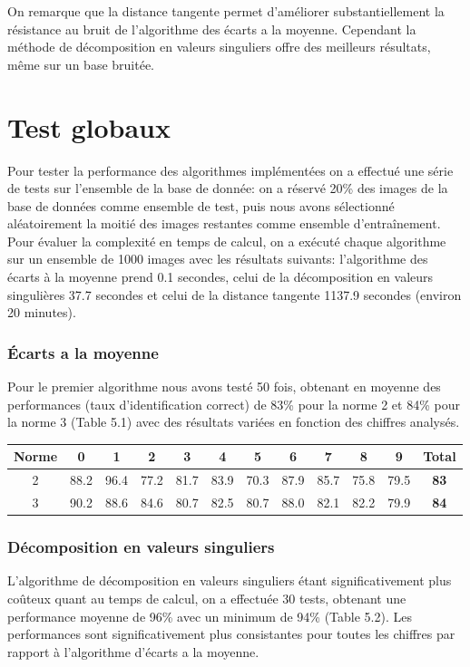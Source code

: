\documentclass[a4paper,11pt,twoside]{report}
\begin{document}
On remarque que la distance tangente permet d’améliorer substantiellement la résistance au bruit de l'algorithme des écarts a la moyenne. Cependant la méthode de décomposition en valeurs singuliers offre des meilleurs résultats, même sur un base bruitée.

\chapter{Test globaux}

Pour tester la performance des algorithmes implémentées on a effectué une série de tests sur l'ensemble de la base de donnée: on a réservé 20\% des images de la base de données comme ensemble de test, puis nous avons sélectionné aléatoirement la moitié des images restantes comme ensemble d’entraînement.\\
Pour évaluer la complexité en temps de calcul, on a exécuté chaque algorithme sur un ensemble de 1000 images avec les résultats suivants: l'algorithme des écarts à la moyenne prend 0.1 secondes, celui de la décomposition en valeurs singulières 37.7 secondes et celui de la distance tangente 1137.9 secondes (environ 20 minutes).

\subsection{Écarts a la moyenne}
Pour le premier algorithme nous avons testé 50 fois, obtenant en moyenne des performances (taux d'identification correct) de 83\% pour la norme 2 et 84\% pour la norme 3 (Table 5.1) avec des résultats variées en fonction des chiffres analysés.

\begin{center}
\begin{tabular}{ |c||c|c|c|c|c|c|c|c|c|c|c| } 
\hline
 Norme & 0 & 1 & 2 & 3 & 4 & 5 & 6 & 7 & 8 & 9 & \textbf{Total} \\ 
  \hline
  \hline
  2 & 88.2 & 96.4 & 77.2 & 81.7 & 83.9 & 70.3 & 87.9 & 85.7 & 75.8 & 79.5 & \textbf{83} \\
 \hline
  3 & 90.2 & 88.6 & 84.6 & 80.7 & 82.5 & 80.7 & 88.0 & 82.1 & 82.2 & 79.9 & \textbf{84} \\
 \hline
\end{tabular}
\end{center}

\subsection{Décomposition en valeurs singuliers}
L'algorithme de décomposition en valeurs singuliers étant significativement plus coûteux quant au temps de calcul, on a effectuée 30 tests, obtenant une performance moyenne de 96\% avec un minimum de 94\% (Table 5.2). Les performances sont significativement plus consistantes pour toutes les chiffres par rapport à l'algorithme d'écarts a la moyenne.
\end{document}
